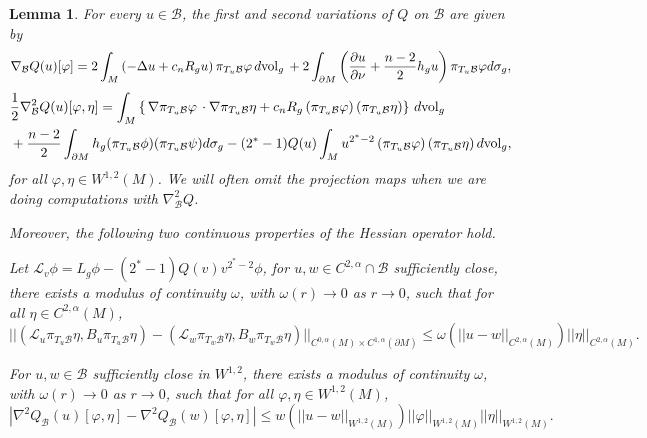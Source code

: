 \documentclass[12pt]{amsart}
\newtheorem{lemma}[theorem]{Lemma}
\newcommand{\vphi}{\varphi}
\newcommand{\na}{{\nabla}}
\newcommand{\B}{\mathcal{B}}
\newcommand{\vol}{{\rm{vol}}}
\begin{document}
\begin{lemma}\label{lem:bm}
    For every $u \in \B$, the first and second variations of $Q$ on $\B$ are given by
    \begin{equation}\label{e:firstvariation}
    \nabla_{\B} Q(u)[\varphi] = 2\int_{M} \left(-\Delta u + c_nR_gu\right)\pi_{T_u\B}\varphi\, d\vol_g\, +2\int_{\partial M} \left( \frac{\partial u}{\partial \nu}+\frac{n-2}{2}h_g u   \right)\pi_{T_u\B}\varphi d\sigma_g ,
    \end{equation}
	\begin{equation}\label{e:secondvariation1}
	\begin{aligned}
	&\frac{1}{2}\nabla_\B^2 Q(u)[\varphi,\eta]
	 = \int_M \left\{  \,\na \pi_{T_u\B}\varphi\,\cdot \na \pi_{T_u\B}\eta + c_n R_g\,(\pi_{T_u\B}\varphi) \,(\pi_{T_u\B}\eta) \right\}\, d\vol_g\\ &+\frac{n-2}{2}\int_{\partial M}h_g(\pi_{T_u\B}\phi) (\pi_{T_u\B}\psi) d\sigma_g-(2^*-1)Q(u)\int_{M} u^{2^*-2}\, (\pi_{T_u\B}\varphi) \,(\pi_{T_u\B}\eta)\, d\vol_g,\end{aligned}
	\end{equation}
 for all $ \varphi,\eta\in W^{1,2}(M)$.	We will often omit the projection maps when we are doing computations with $\nabla_{\B}^2Q$.

 Moreover, the following two continuous properties of the Hessian operator hold.

 Let $\mathcal{L}_v \phi = L_g \phi -(2^*-1)Q(v)v^{2^*-2} \phi $, for $u,w \in C^{2,\alpha} \cap \B$ sufficiently close, there exists a modulus of continuity $\omega$, with $\omega(r) \to 0$ as $r\to 0$, such that  for all $\eta \in C^{2,\alpha}(M)$,
 \begin{equation}\label{prop1}
     ||(\mathcal{L}_u \pi_{T_u{\B}} \eta, B_u \pi_{T_u{\B}} \eta )-(\mathcal{L}_w \pi_{T_w{\B}} \eta, B_w \pi_{T_w{\B}} \eta )||_{C^{0,\alpha}(M) \times C^{1,\alpha}(\partial M)} \leq \omega(||u-w||_{C^{2,\alpha}(M)})||\eta||_{C^{2,\alpha}(M)}.
 \end{equation}

 For $u,w \in \B$ sufficiently close in $W^{1,2}$, there exists a modulus of continuity $\omega$, with $\omega(r) \to 0$ as $r\to 0$, such that  for all $\vphi, \eta \in W^{1,2}(M)$,
 \begin{equation}\label{prop2}
     |\na ^2 Q_\B(u)[\vphi,\eta]-\na ^2 Q_\B(w)[\vphi,\eta]|\leq w(||u-w||_{W^{1,2}(M)})||\vphi||_{W^{1,2}(M)}||\eta||_{W^{1,2}(M)}.
 \end{equation}



\end{lemma}
\end{document}
